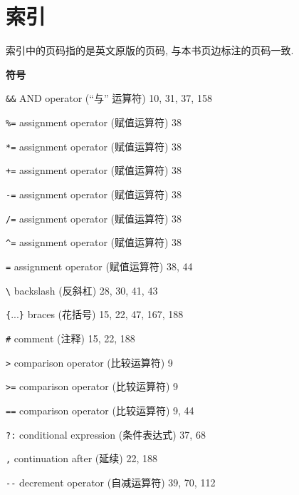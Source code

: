 \chapter{索引}
\label{chap:index}

索引中的页码指的是英文原版的页码, 与本书页边标注的页码一致.

\begin{multicols}{2}

\setlength\parindent{0pt}
\small

\medskip\textbf{\large{符号}}

\hangindent=2pc  \verb'&&' AND operator (``与'' 运算符) 10, 31, 37, 158

\hangindent=2pc  \verb'%=' assignment operator (赋值运算符) 38

\hangindent=2pc  \verb'*=' assignment operator (赋值运算符) 38

\hangindent=2pc  \verb'+=' assignment operator (赋值运算符) 38

\hangindent=2pc  \verb'-=' assignment operator (赋值运算符) 38

\hangindent=2pc  \verb'/=' assignment operator (赋值运算符) 38

\hangindent=2pc  \verb'^=' assignment operator (赋值运算符) 38

\hangindent=2pc  \verb'=' assignment operator (赋值运算符) 38, 44

\hangindent=2pc  \verb'\' backslash (反斜杠) 28, 30, 41, 43

\hangindent=2pc  \verb'{'...\verb'}' braces (花括号) 15, 22, 47, 167, 188

\hangindent=2pc  \verb'#' comment (注释) 15, 22, 188

\hangindent=2pc  \verb'>' comparison operator (比较运算符) 9

\hangindent=2pc  \verb'>=' comparison operator (比较运算符) 9

\hangindent=2pc  \verb'==' comparison operator (比较运算符) 9, 44

\hangindent=2pc  \verb'?:' conditional expression (条件表达式) 37, 68

\hangindent=2pc  \verb',' continuation after (延续) 22, 188

\hangindent=2pc  \verb'--' decrement operator (自减运算符) 39, 70, 112


\end{multicols}
